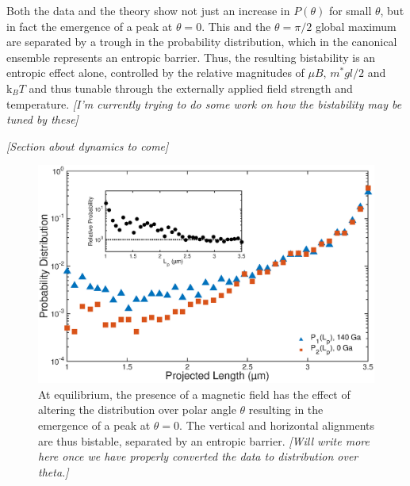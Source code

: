 \documentclass[aps,prl,twocolumn,superscriptaddress]{revtex4-1}
\newcommand{\kk}{\mathrm{k}_B}
\begin{document}
Both the data and the theory show not just an increase in $P(\theta)$ for small $\theta$, but in fact the emergence of a peak at $\theta=0$. This and the $\theta=\pi/2$ global maximum are separated by a trough in the probability distribution, which in the canonical ensemble represents an entropic barrier. Thus, the resulting bistability is an entropic effect alone, controlled by the relative magnitudes of $\mu B$, $m^*gl/2$ and $\kk T$ and thus tunable through the externally applied field strength and temperature. \emph{[I'm currently trying to do some work on how the bistability may be tuned by these]}


\emph{[Section about dynamics to come]}


\begin{figure}
\includegraphics[width=0.95\columnwidth]{figs/Figure3.eps}
\caption{\footnotesize At equilibrium, the presence of a magnetic field has the effect of altering the distribution over polar angle $\theta$ resulting in the emergence of a peak at $\theta=0$. The vertical and horizontal alignments are thus bistable, separated by an entropic barrier. \label{fig:data} \emph{[Will write more here once we have properly converted the data to distribution over theta.]}}
\end{figure}
\end{document}
